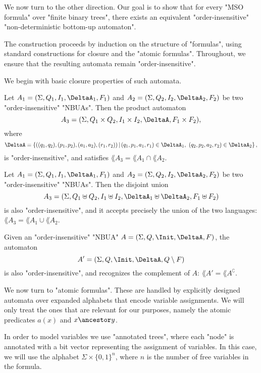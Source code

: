 \documentclass[a4paper,UKenglish,cleveref, autoref, thm-restate]{lipics-v2021}
\begin{document}
We now turn to the other direction. Our goal is to show that for every "MSO formula" over "finite binary trees",
there exists an equivalent "order-insensitive" "non-deterministic bottom-up automaton".

The construction proceeds by induction on the structure of "formulas", using standard constructions for closure and the "atomic formulas".
Throughout, we ensure that the resulting automata remain "order-insensitive".

We begin with basic closure properties of such automata.

\begin{lemma}[Intersection]\label{lem:intersection}
	Let $A_1 = (\Sigma, Q_1, I_1, \DeltaA_1, F_1)$ and $A_2 = (\Sigma, Q_2, I_2, \DeltaA_2, F_2)$ be two "order-insensitive" "NBUAs". Then the product automaton
	\[
		A_3 = (\Sigma, Q_1 \times Q_2, I_1 \times I_2, \DeltaA, F_1 \times F_2),
	\]
	where
	\[
		\DeltaA = \left\{ ((q_1,q_2), (p_1,p_2), (a_1,a_2), (r_1,r_2)) \,\middle|\, (q_1,p_1,a_1,r_1) \in \DeltaA_1,\ (q_2,p_2,a_2,r_2) \in \DeltaA_2 \right\},
	\]
	is "order-insensitive", and satisfies $\lang{A_3} = \lang{A_1} \cap \lang{A_2}$.
\end{lemma}

\begin{lemma}[Union]\label{lem:union}
	Let $A_1 = (\Sigma, Q_1, I_1, \DeltaA_1, F_1)$ and $A_2 = (\Sigma, Q_2, I_2, \DeltaA_2, F_2)$ be two "order-insensitive" "NBUAs". Then the disjoint union
	\[
		A_3 = (\Sigma, Q_1 \uplus Q_2, I_1 \uplus I_2, \DeltaA_1 \uplus \DeltaA_2, F_1 \uplus F_2)
	\]
	is also "order-insensitive", and it accepts precisely the union of the two languages: $\lang{A_3} = \lang{A_1} \cup \lang{A_2}$.
\end{lemma}

\begin{lemma}[Complement]\label{lem:complement}
	Given an "order-insensitive" "NBUA" $A = (\Sigma, Q, \Init, \DeltaA, F)$, the automaton
	\[
		A' = (\Sigma, Q, \Init, \DeltaA, Q \setminus F)
	\]
	is also "order-insensitive", and recognizes the complement of $A$: $\lang{A'} = \lang{A}^\complement$.
\end{lemma}

We now turn to "atomic formulas". These are handled by explicitly designed automata over expanded alphabets that encode variable assignments.
We will only treat the ones that are relevant for our purposes, namely the atomic predicates $a(x)$ and $x \ancestor y$.

In order to model variables we use "annotated trees", where each "node" is annotated with a bit vector representing the assignment of variables.
In this case, we will use the alphabet $\Sigma \times \{0,1\}^n$, where $n$ is the number of free variables in the formula.
\end{document}
